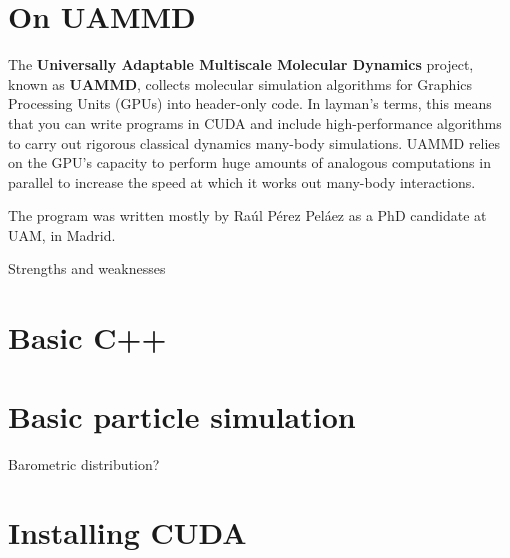 \section*{On UAMMD}

The \textbf{Universally Adaptable Multiscale Molecular Dynamics} project,
known as \textbf{UAMMD}, collects molecular simulation algorithms for Graphics 
Processing Units (GPUs) into header-only code. In layman's terms, this means 
that you can write programs in CUDA and include high-performance algorithms to 
carry out rigorous classical dynamics many-body simulations. UAMMD relies on the 
GPU's capacity to perform huge amounts of analogous computations in parallel to 
increase the speed at which it works out many-body interactions.

The program was written mostly by Ra\'ul P\'erez Pel\'aez as a PhD candidate at
UAM, in Madrid.

Strengths and weaknesses

\section*{Basic C++}

\section*{Basic particle simulation}

Barometric distribution?

\section*{Installing CUDA}

